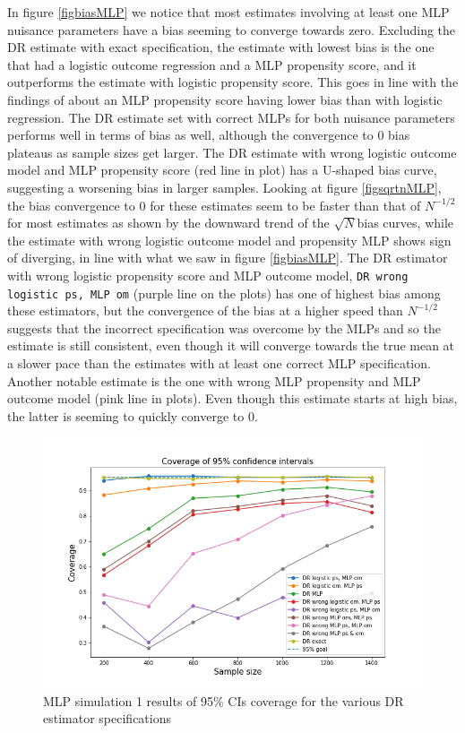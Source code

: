 \documentclass[12pt,twoside]{article}
\begin{document}
In figure \ref{figbiasMLP} we notice that most estimates involving at least one MLP nuisance parameters have a bias seeming to converge towards zero. Excluding the DR estimate with exact specification, the estimate with lowest bias is the one that had a logistic outcome regression and a MLP propensity score, and it outperforms the estimate with logistic propensity score. This goes in line with the findings of \citet{setoguchi-nn} about an MLP propensity score having lower bias than with logistic regression. The DR estimate set with correct MLPs for both nuisance parameters performs well in terms of bias as well, although the convergence to 0 bias plateaus as sample sizes get larger. The DR estimate with wrong logistic outcome model and MLP propensity score (red line in plot) has a U-shaped bias curve, suggesting a worsening bias in larger samples. Looking at figure \ref{figsqrtnMLP}, the bias convergence to 0 for these estimates seem to be faster than that of $N^{-1/2}$ for most estimates as shown by the downward trend of the $\sqrt{N}$bias curves, while the estimate with wrong logistic outcome model and propensity MLP shows sign of diverging, in line with what we saw in figure \ref{figbiasMLP}. The DR estimator with wrong logistic propensity score and MLP outcome model, \texttt{DR wrong logistic ps, MLP om} (purple line on the plots) has one of highest bias among these estimators, but the convergence of the bias at a higher speed than $N^{-1/2}$ suggests that the incorrect specification was overcome by the MLPs and so the estimate is still consistent, even though it will converge towards the true mean at a slower pace than the estimates with at least one correct MLP specification. Another notable estimate is the one with wrong MLP propensity and MLP outcome model (pink line in plots). Even though this estimate starts at high bias, the latter is seeming to quickly converge to 0.

\begin{figure}[h!]
    \centering
    \includegraphics[width = 0.9\columnwidth]{figures/CIMLP.png}
    \caption{MLP simulation 1 results of 95\% CIs coverage for the various DR estimator specifications}
    \label{figCIMLP}
\end{figure}
\end{document}
